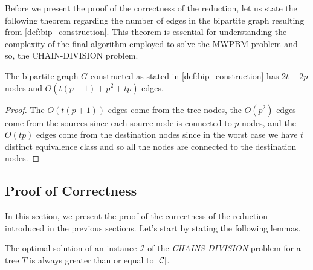Before we present the proof of the correctness of the reduction, let us state the following theorem regarding the number of edges in the bipartite graph resulting from \cref{def:bip_construction}. This theorem is essential for understanding the complexity of the final algorithm employed to solve the \textsc{MWPBM} problem and so, the \textsc{CHAIN-DIVISION} problem.

\begin{theorem}
    The bipartite graph $G$ constructed as stated in \cref{def:bip_construction} has $2t + 2p$ nodes and $O(t (p + 1) + p^2 + tp)$ edges.
\end{theorem}

\begin{proof}
    The $O(t (p + 1))$ edges come from the tree nodes, the $O(p^2)$ edges come from the sources since each source node is connected to $p$ nodes, and the $O(tp)$ edges come from the destination nodes since in the worst case we have $t$ distinct equivalence class and so all the nodes are connected to the destination nodes. 
\end{proof}

\subsection{Proof of Correctness}
In this section, we present the proof of the correctness of the reduction introduced in the previous sections. Let's start by stating the following lemmas.

\begin{comment}
\begin{lemma} \label{lemma:all_destinations}
    Exactly $|\equivset|$ nodes of the set $\treeset{1}$ are connected to all the destination nodes $d_i \in \destset$ with weight $0$.
\end{lemma}

\begin{proof}
    As outlined in \cref{def:bip_construction}, the destination nodes $d_i \in V_2$ are connected to nodes $u_i \in \treeset{1}$ with weight $0$ iff for all $v_j \in \treeset{2}$ such that $j > i$, $\equivsetfunc{v_j} \neq \equivsetfunc{u_i}$, i.e. $u_i$ is the last of its class in the ordering. Consequently, there are exactly $|\equivset|$ nodes in $\treeset{1}$ that are last representatives of their class in the ordering.
\end{proof}
\end{comment}

\begin{lemma} \label{lemma:optimal_cost}
    The optimal solution of an instance $\mathcal{I}$ of the \textit{CHAINS-DIVISION} problem for a tree $T$ is always greater than or equal to $|\mathcal{C}|$.
\end{lemma}

